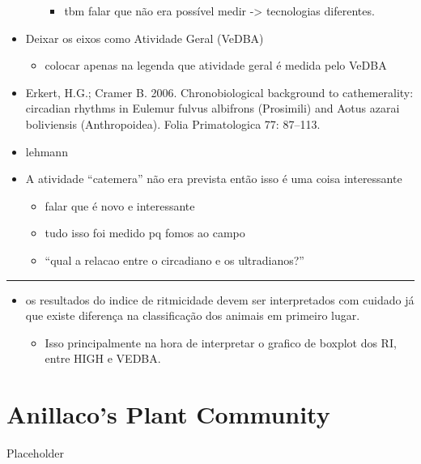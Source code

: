 \documentclass[english,msc,numbers,hidelinks]{coppe}
\providecommand{\tightlist}{%
  \setlength{\itemsep}{0pt}\setlength{\parskip}{0pt}}
\begin{document}
\begin{itemize}
\begin{itemize}
\begin{itemize}
      \item
        tbm falar que não era possível medir -\textgreater{} tecnologias diferentes.
      \end{itemize}
    \end{itemize}
  \item
    Deixar os eixos como Atividade Geral (VeDBA)
    \begin{itemize}
    \tightlist
    \item
      colocar apenas na legenda que atividade geral é medida pelo VeDBA
    \end{itemize}
  \item
    Erkert, H.G.; Cramer B. 2006. Chronobiological background to cathemerality: circadian rhythms in Eulemur fulvus albifrons (Prosimili) and Aotus azarai boliviensis (Anthropoidea). Folia Primatologica 77: 87--113.
  \item
    lehmann
  \item
    A atividade ``catemera'' não era prevista então isso é uma coisa interessante
    \begin{itemize}
    \tightlist
    \item
      falar que é novo e interessante
    \item
      tudo isso foi medido pq fomos ao campo
    \item
      ``qual a relacao entre o circadiano e os ultradianos?''
    \end{itemize}
  \end{itemize}
  \begin{center}\rule{0.5\linewidth}{0.5pt}\end{center}
  \begin{itemize}
  \item
    os resultados do indice de ritmicidade devem ser interpretados com cuidado já que existe diferença na classificação dos animais em primeiro lugar.
    \begin{itemize}
    \tightlist
    \item
      Isso principalmente na hora de interpretar o grafico de boxplot dos RI, entre HIGH e VEDBA.
    \end{itemize}
  \end{itemize}
  \hypertarget{anillacos-plant-community}{%
  \chapter{Anillaco's Plant Community}\label{anillacos-plant-community}}

  Placeholder
\end{document}

